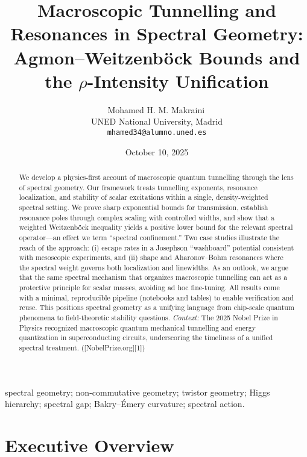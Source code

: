 \documentclass[11pt]{article}
\theoremstyle{definition}
\begin{document}
    \title{\textbf{Macroscopic Tunnelling and Resonances in Spectral Geometry:}\\ Agmon–Weitzenböck Bounds and the \(\rho\)-Intensity Unification}
    
	\author{Mohamed H. M. Makraini\,\\
		\small UNED National University, Madrid\\
		\small \texttt{mhamed34@alumno.uned.es}}
	\date{October 10, 2025}
	\maketitle
	
	\begin{abstract}
		We develop a physics-first account of macroscopic quantum tunnelling through the lens of spectral geometry. Our framework treats tunnelling exponents, resonance localization, and stability of scalar excitations within a single, density-weighted spectral setting. We prove sharp exponential bounds for transmission, establish resonance poles through complex scaling with controlled widths, and show that a weighted Weitzenböck inequality yields a positive lower bound for the relevant spectral operator—an effect we term ``spectral confinement.'' Two case studies illustrate the reach of the approach: (i) escape rates in a Josephson “washboard” potential consistent with mesoscopic experiments, and (ii) shape and Aharonov–Bohm resonances where the spectral weight governs both localization and linewidths. As an outlook, we argue that the same spectral mechanism that organizes macroscopic tunnelling can act as a protective principle for scalar masses, avoiding ad hoc fine-tuning. All results come with a minimal, reproducible pipeline (notebooks and tables) to enable verification and reuse. This positions spectral geometry as a unifying language from chip-scale quantum phenomena to field-theoretic stability questions.
		\textit{Context:} The 2025 Nobel Prize in Physics recognized macroscopic quantum mechanical tunnelling and energy quantization in superconducting circuits, underscoring the timeliness of a unified spectral treatment. ([NobelPrize.org][1])
	\end{abstract}
	
	spectral geometry; non-commutative geometry; twistor geometry; Higgs hierarchy; spectral gap; Bakry–Émery curvature; spectral action.
	
	\section*{Executive Overview}
	
\end{document}
